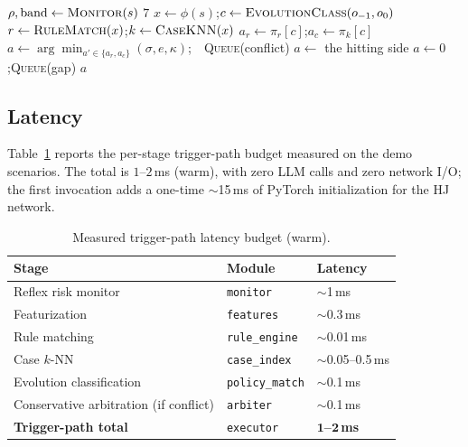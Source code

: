 \documentclass[conference]{IEEEtran}
\begin{document}
\begin{algorithm}[t]
\caption{Online decision $D(s;\mathcal{L})$ (LLM-free)}
\label{alg:online}
\begin{algorithmic}[1]
\STATE $\rho,\text{band}\leftarrow\textsc{Monitor}(s)$
  \RETURN $7$ 
\ENDIF
\STATE $x\leftarrow\phi(s)$;\quad $c\leftarrow\textsc{EvolutionClass}(o_{-1},o_0)$
\STATE $r\leftarrow\textsc{RuleMatch}(x)$;\quad $k\leftarrow\textsc{CaseKNN}(x)$
\STATE $a_r\leftarrow\pi_r[c]$;\quad $a_c\leftarrow\pi_k[c]$
  \STATE $a\leftarrow\arg\min_{a'\in\{a_r,a_c\}}(\sigma,e,\kappa)$;\ \ \textsc{Queue}(conflict)
  \STATE $a\leftarrow$ the hitting side
\ELSE
  \STATE $a\leftarrow 0$;\quad \textsc{Queue}(gap) 
\ENDIF
\RETURN $a$
\end{algorithmic}
\end{algorithm}

\subsection{Latency}
Table~\ref{tab:latency} reports the per-stage trigger-path budget measured on
the demo scenarios. The total is $1$--$2$\,ms (warm), with zero LLM calls and
zero network I/O; the first invocation adds a one-time $\sim$15\,ms of
PyTorch initialization for the HJ network.

\begin{table}[t]
\caption{Measured trigger-path latency budget (warm).}
\label{tab:latency}
\centering
\begin{tabular}{@{}lll@{}}
\toprule
Stage & Module & Latency \\
\midrule
Reflex risk monitor & \texttt{monitor} & $\sim$1\,ms \\
Featurization & \texttt{features} & $\sim$0.3\,ms \\
Rule matching & \texttt{rule\_engine} & $\sim$0.01\,ms \\
Case $k$-NN & \texttt{case\_index} & $\sim$0.05--0.5\,ms \\
Evolution classification & \texttt{policy\_match} & $\sim$0.1\,ms \\
Conservative arbitration (if conflict) & \texttt{arbiter} & $\sim$0.1\,ms \\
\midrule
\textbf{Trigger-path total} & \texttt{executor} & \textbf{$\mathbf{1}$--$\mathbf{2}$\,ms} \\
\bottomrule
\end{tabular}
\end{table}
\end{document}
